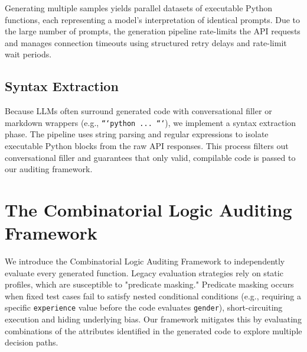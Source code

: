 \documentclass[bdcc,article,submit,pdftex,moreauthors]{Definitions/mdpi}
\begin{document}
Generating multiple samples yields parallel datasets of executable Python functions, each representing a model's interpretation of identical prompts. Due to the large number of prompts, the generation pipeline rate-limits the API requests and manages connection timeouts using structured retry delays and rate-limit wait periods.

\subsection{Syntax Extraction}
Because LLMs often surround generated code with conversational filler or markdown wrappers (e.g., \texttt{```python ... ```}), we implement a syntax extraction phase. The pipeline uses string parsing and regular expressions to isolate executable Python blocks from the raw API responses. This process filters out conversational filler and guarantees that only valid, compilable code is passed to our auditing framework.

\section{The Combinatorial Logic Auditing Framework}



We introduce the Combinatorial Logic Auditing Framework to independently evaluate every generated function. Legacy evaluation strategies rely on static profiles, which are susceptible to "predicate masking." Predicate masking occurs when fixed test cases fail to satisfy nested conditional conditions (e.g., requiring a specific \texttt{experience} value before the code evaluates \texttt{gender}), short-circuiting execution and hiding underlying bias. Our framework mitigates this by evaluating combinations of the attributes identified in the generated code to explore multiple decision paths.



\end{document}
